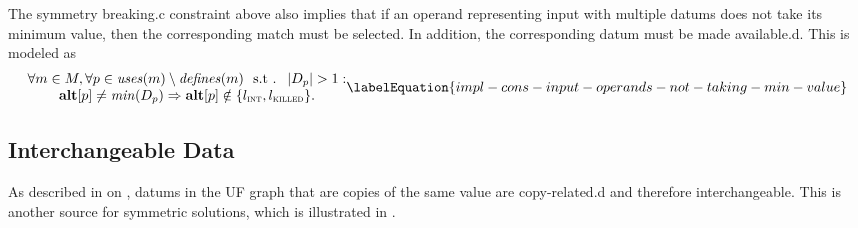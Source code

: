 The \gls{symmetry breaking.c} \gls{constraint} above also implies that if an
\gls{operand} representing input with multiple \glspl{datum} does not take its
minimum value, then the corresponding \gls{match} must be selected.
%
In addition, the corresponding \gls{datum} must be made \gls{available.d}.
%
This is modeled as
%
\begin{equation}
  \begin{array}{@{}c@{}}
    \forall m \in \mMatchSet,
    \forall p \in \mUses(m) \setminus \mDefines(m)
    \text{ \st }
    \mCard{\mDataSet[p]} > 1 : \\
    \mVar{alt}[p] \neq \mMin(\mDataSet[p])
    \mImp
    \mVar{alt}[p] \notin \mSet{\mIntLocation, \mKilledLocation}.
  \end{array}
  \labelEquation{impl-cons-input-operands-not-taking-min-value}
\end{equation}


\subsection{Interchangeable Data}

As described in  on
, \glspl{datum} in the \gls{UF graph}
that are copies of the same value are \gls{copy-related.d} and therefore
interchangeable.
%
This is another source for symmetric \glspl{solution}, which is illustrated in
.


